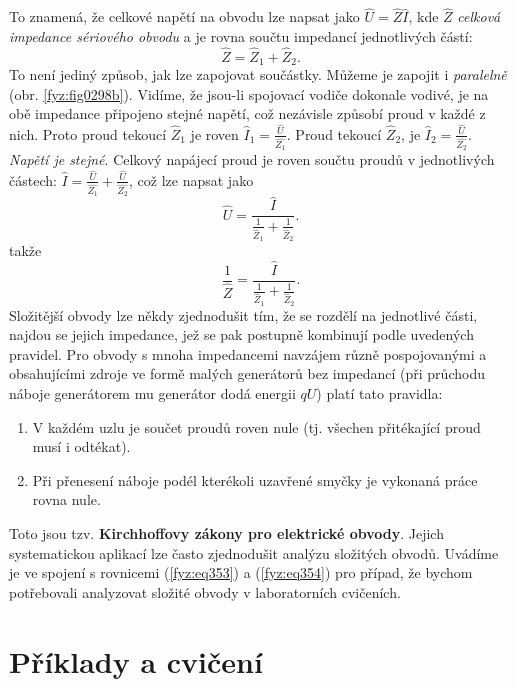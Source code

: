     To znamená, že celkové napětí na obvodu lze napsat jako \(\hat{U}=\hat{Z}\hat{I}\), kde  
    \(\hat{Z}\) \emph{celková impedance sériového obvodu} a je rovna součtu impedancí jednotlivých 
    částí:
    \begin{equation}\label{fyz:eq352}
      \hat{Z} = \hat{Z}_1 + \hat{Z}_2.
    \end{equation}
    To není jediný způsob, jak lze zapojovat součástky. Můžeme je zapojit i \emph{paralelně} (obr. 
    \ref{fyz:fig0298b}). Vidíme, že jsou-li spojovací vodiče dokonale vodivé, je na obě impedance 
    připojeno stejné napětí, což nezávisle způsobí proud v každé z nich. Proto proud tekoucí 
    \(\hat{Z}_1\) je roven \(\hat{I}_1=\frac{\hat{U}}{\hat{Z_1}}\). Proud tekoucí \(\hat{Z}_2\), je 
    \(\hat{I}_2=\frac{\hat{U}}{\hat{Z_2}}\). \emph{Napětí je stejné}. Celkový napájecí proud je 
    roven součtu proudů v jednotlivých částech: \(\hat{I}=\frac{\hat{U}}{\hat{Z_1}} + 
    \frac{\hat{U}}{\hat{Z_2}}\), což lze napsat jako
    \begin{equation}\label{fyz:eq353}
      \hat{U} = \frac{\hat{I}}{\frac{1}{\hat{Z}_1} + \frac{1}{\hat{Z}_2}}.
    \end{equation}
    takže
    \begin{equation}\label{fyz:eq354}
      \frac{1}{\hat{Z}} = \frac{\hat{I}}{\frac{1}{\hat{Z}_1} + \frac{1}{\hat{Z}_2}}.
    \end{equation}
    Složitější obvody lze někdy zjednodušit tím, že se rozdělí na jednotlivé části, najdou se 
    jejich impedance, jež se pak postupně kombinují podle uvedených pravidel. Pro obvody s mnoha 
    impedancemi navzájem různě pospojovanými a obsahujícími zdroje ve formě malých generátorů bez 
    impedancí (při průchodu náboje generátorem mu generátor dodá energii \(qU\)) platí tato 
    pravidla: 
    \begin{enumerate}[noitemsep]
      \item V každém uzlu je součet proudů roven nule (tj. všechen přitékající proud musí i 
            odtékat). 
      \item Při přenesení náboje podél kterékoli uzavřené smyčky je vykonaná práce rovna nule. 
    \end{enumerate}
    Toto jsou tzv. \textbf{Kirchhoffovy zákony pro elektrické obvody}. Jejich systematickou 
    aplikací lze často zjednodušit analýzu složitých obvodů. Uvádíme je ve spojení s rovnicemi 
    (\ref{fyz:eq353}) a (\ref{fyz:eq354}) pro případ, že bychom potřebovali analyzovat složité 
    obvody v laboratorních cvičeních.
    
  \section{Příklady a cvičení}\label{fyz:IchapXXVsecVI}
    
